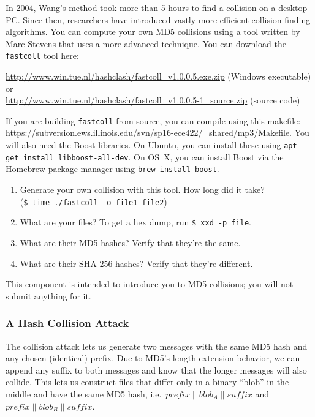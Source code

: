 \documentclass[letterpaper,12pt]{report}
\begin{document}
In 2004, Wang's method took more than 5 hours to find a collision on a desktop PC.  Since then, researchers have introduced vastly more efficient collision finding algorithms.  You can compute your own MD5 collisions using a tool written by Marc Stevens that uses a more advanced technique.  You can download the \texttt{fastcoll} tool here:
\medskip
 
\url{http://www.win.tue.nl/hashclash/fastcoll_v1.0.0.5.exe.zip} (Windows executable) or\\
\url{http://www.win.tue.nl/hashclash/fastcoll_v1.0.0.5-1_source.zip} (source code)
\medskip

If you are building \texttt{fastcoll} from source, you can compile using this makefile:
\url{https://subversion.ews.illinois.edu/svn/sp16-ece422/_shared/mp3/Makefile}.  You will also need the Boost libraries.  On Ubuntu, you can install these using \texttt{apt-get install libboost-all-dev}.  On OS~X, you can install Boost via the Homebrew package manager using \texttt{brew install boost}.
 
\begin{enumerate}
\item Generate your own collision with this tool.  How long did it take?\\
(\texttt{\$ time ./fastcoll -o file1 file2})
\item What are your files?  To get a hex dump, run \texttt{\$ xxd -p file}.
\item What are their MD5 hashes?  Verify that they're the same.
\item What are their SHA-256 hashes?  Verify that they're different.
\end{enumerate}
 
This component is intended to introduce you to MD5 collisions; you will not submit anything for it.

 \subsubsection{A Hash Collision Attack}
The collision attack lets us generate two messages with the same MD5 hash and any chosen (identical) prefix.  Due to MD5's length-extension behavior, we can append any suffix to both messages and know that the longer messages will also collide.  This lets us construct files that differ only in a binary ``blob'' in the middle and have the same MD5 hash, i.e.\ ${prefix} \parallel {blob}_A \parallel {suffix}$ and ${prefix} \parallel {blob}_B \parallel {suffix}$.
\end{document}
